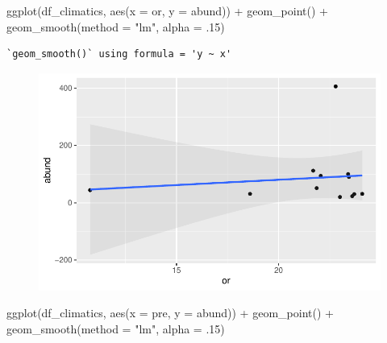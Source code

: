 \documentclass[
  letterpaper,
  DIV=11,
  numbers=noendperiod]{scrartcl}
\newenvironment{Shaded}{\begin{snugshade}}{\end{snugshade}}
\newcommand{\AttributeTok}[1]{\textcolor[rgb]{0.40,0.45,0.13}{#1}}
\newcommand{\DecValTok}[1]{\textcolor[rgb]{0.68,0.00,0.00}{#1}}
\newcommand{\FunctionTok}[1]{\textcolor[rgb]{0.28,0.35,0.67}{#1}}
\newcommand{\NormalTok}[1]{\textcolor[rgb]{0.00,0.23,0.31}{#1}}
\newcommand{\SpecialCharTok}[1]{\textcolor[rgb]{0.37,0.37,0.37}{#1}}
\newcommand{\StringTok}[1]{\textcolor[rgb]{0.13,0.47,0.30}{#1}}
\begin{document}
\begin{Shaded}
\begin{Highlighting}[]
\FunctionTok{ggplot}\NormalTok{(df\_climatics, }\FunctionTok{aes}\NormalTok{(}\AttributeTok{x =}\NormalTok{ or, }\AttributeTok{y =}\NormalTok{ abund)) }\SpecialCharTok{+}
  \FunctionTok{geom\_point}\NormalTok{() }\SpecialCharTok{+}
  \FunctionTok{geom\_smooth}\NormalTok{(}\AttributeTok{method =} \StringTok{"lm"}\NormalTok{, }\AttributeTok{alpha =}\NormalTok{ .}\DecValTok{15}\NormalTok{)}
\end{Highlighting}
\end{Shaded}

\begin{verbatim}
`geom_smooth()` using formula = 'y ~ x'
\end{verbatim}

\begin{figure}[H]

{\centering \includegraphics{report_nmds_files/figure-pdf/unnamed-chunk-9-1.pdf}

}

\end{figure}

\begin{Shaded}
\begin{Highlighting}[]
\FunctionTok{ggplot}\NormalTok{(df\_climatics, }\FunctionTok{aes}\NormalTok{(}\AttributeTok{x =}\NormalTok{ pre, }\AttributeTok{y =}\NormalTok{ abund)) }\SpecialCharTok{+}
  \FunctionTok{geom\_point}\NormalTok{() }\SpecialCharTok{+}
  \FunctionTok{geom\_smooth}\NormalTok{(}\AttributeTok{method =} \StringTok{"lm"}\NormalTok{, }\AttributeTok{alpha =}\NormalTok{ .}\DecValTok{15}\NormalTok{)}
\end{Highlighting}
\end{Shaded}
\end{document}
